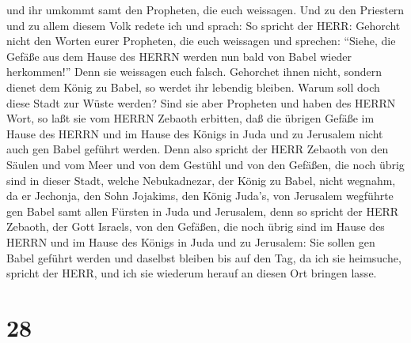 und ihr umkommt samt den Propheten, die euch weissagen. 
Und zu den Priestern und zu allem diesem Volk redete ich und sprach: So
spricht der HERR: Gehorcht nicht den Worten eurer Propheten, die euch
weissagen und sprechen: ``Siehe, die Gefäße aus dem Hause des HERRN
werden nun bald von Babel wieder herkommen!'' Denn sie weissagen euch
falsch.  Gehorchet ihnen nicht, sondern dienet dem König zu
Babel, so werdet ihr lebendig bleiben. Warum soll doch diese Stadt zur
Wüste werden?  Sind sie aber Propheten und haben des HERRN
Wort, so laßt sie vom HERRN Zebaoth erbitten, daß die übrigen Gefäße im
Hause des HERRN und im Hause des Königs in Juda und zu Jerusalem nicht
auch gen Babel geführt werden.  Denn also spricht der HERR
Zebaoth von den Säulen und vom Meer und von dem Gestühl und von den
Gefäßen, die noch übrig sind in dieser Stadt,  welche
Nebukadnezar, der König zu Babel, nicht wegnahm, da er Jechonja, den
Sohn Jojakims, den König Juda's, von Jerusalem wegführte gen Babel samt
allen Fürsten in Juda und Jerusalem,  denn so spricht der
HERR Zebaoth, der Gott Israels, von den Gefäßen, die noch übrig sind im
Hause des HERRN und im Hause des Königs in Juda und zu Jerusalem:
 Sie sollen gen Babel geführt werden und daselbst bleiben
bis auf den Tag, da ich sie heimsuche, spricht der HERR, und ich sie
wiederum herauf an diesen Ort bringen lasse.

\hypertarget{section-27}{%
\section{28}\label{section-27}}

